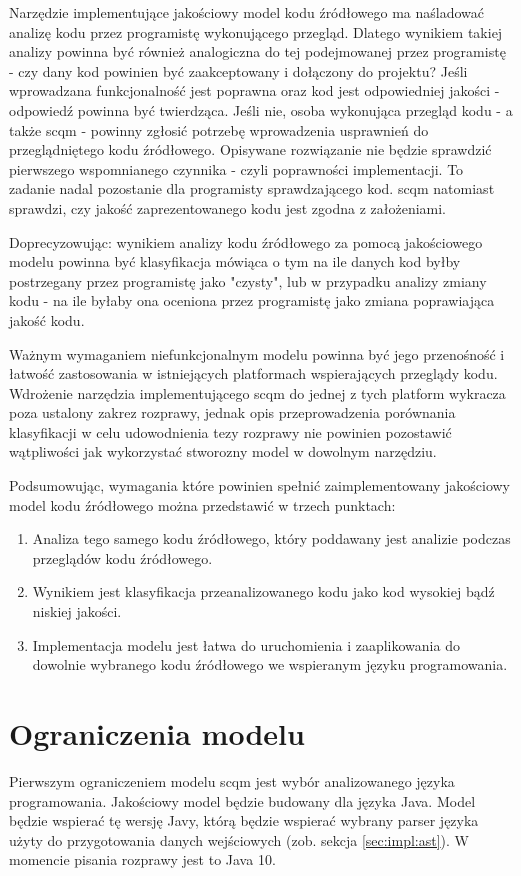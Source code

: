 \documentclass[12pt]{report}
\begin{document}
Narzędzie implementujące jakościowy model kodu źródłowego ma naśladować analizę kodu przez programistę wykonującego przegląd. Dlatego wynikiem takiej analizy powinna być również analogiczna do tej podejmowanej przez programistę - czy dany kod powinien być zaakceptowany i dołączony do projektu? Jeśli wprowadzana funkcjonalność jest poprawna oraz kod jest odpowiedniej jakości - odpowiedź powinna być twierdząca. Jeśli nie, osoba wykonująca przegląd kodu - a także \gls{scqm} - powinny zgłosić potrzebę wprowadzenia usprawnień do przeglądniętego kodu źródłowego. Opisywane rozwiązanie nie będzie sprawdzić pierwszego wspomnianego czynnika - czyli poprawności implementacji. To zadanie nadal pozostanie dla programisty sprawdzającego kod. \gls{scqm} natomiast sprawdzi, czy jakość zaprezentowanego kodu jest zgodna z założeniami.

Doprecyzowując: wynikiem analizy kodu źródłowego za pomocą jakościowego modelu powinna być klasyfikacja mówiąca o tym na ile danych kod byłby postrzegany przez programistę jako "czysty", lub w przypadku analizy zmiany kodu - na ile byłaby ona oceniona przez programistę jako zmiana poprawiająca jakość kodu.

Ważnym wymaganiem niefunkcjonalnym modelu powinna być jego przenośność i łatwość zastosowania w istniejących platformach wspierających przeglądy kodu. Wdrożenie narzędzia implementującego \gls{scqm} do jednej z tych platform wykracza poza ustalony zakrez rozprawy, jednak opis przeprowadzenia porównania klasyfikacji w celu udowodnienia tezy rozprawy nie powinien pozostawić wątpliwości jak wykorzystać stworozny model w dowolnym narzędziu.

Podsumowując, wymagania które powinien spełnić zaimplementowany jakościowy model kodu źródłowego można przedstawić w trzech punktach:

\begin{enumerate}
\item Analiza tego samego kodu źródłowego, który poddawany jest analizie podczas przeglądów kodu źródłowego.
\item Wynikiem jest klasyfikacja przeanalizowanego kodu jako kod wysokiej bądź niskiej jakości.
\item Implementacja modelu jest łatwa do uruchomienia i zaaplikowania do dowolnie wybranego kodu źródłowego we wspieranym języku programowania.
\end{enumerate}

\section{Ograniczenia modelu}
Pierwszym ograniczeniem modelu \gls{scqm} jest wybór analizowanego języka programowania. Jakościowy model będzie budowany dla języka Java. Model będzie wspierać tę wersję Javy, którą będzie wspierać wybrany parser języka użyty do przygotowania danych wejściowych (zob. sekcja \ref{sec:impl:ast}). W momencie pisania rozprawy jest to Java 10.
\end{document}
